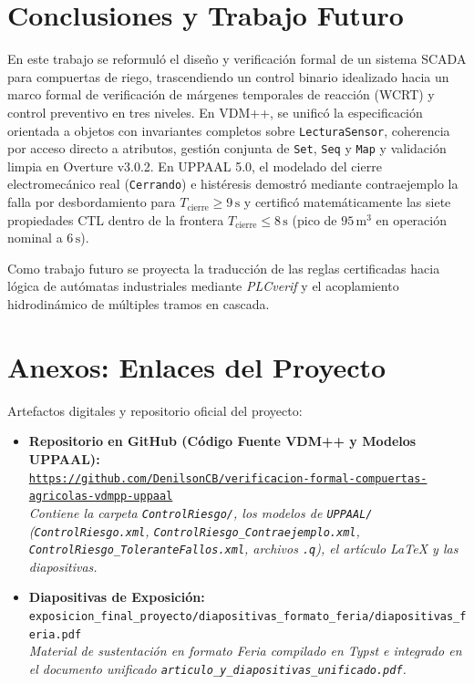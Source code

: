 \documentclass[conference]{IEEEtran}
\begin{document}
\section{Conclusiones y Trabajo Futuro}
En este trabajo se reformuló el diseño y verificación formal de un sistema SCADA para compuertas de riego, trascendiendo un control binario idealizado hacia un marco formal de verificación de márgenes temporales de reacción (WCRT) y control preventivo en tres niveles. En VDM++, se unificó la especificación orientada a objetos con invariantes completos sobre \texttt{LecturaSensor}, coherencia por acceso directo a atributos, gestión conjunta de \texttt{Set}, \texttt{Seq} y \texttt{Map} y validación limpia en Overture v3.0.2. En UPPAAL 5.0, el modelado del cierre electromecánico real (\texttt{Cerrando}) e histéresis demostró mediante contraejemplo la falla por desbordamiento para $T_{\text{cierre}} \geq 9\,\text{s}$ y certificó matemáticamente las siete propiedades CTL dentro de la frontera $T_{\text{cierre}} \leq 8\,\text{s}$ (pico de $95\,\text{m}^3$ en operación nominal a $6\,\text{s}$).

Como trabajo futuro se proyecta la traducción de las reglas certificadas hacia lógica de autómatas industriales mediante \textit{PLCverif} \cite{lopezmiguel2021plcverif} y el acoplamiento hidrodinámico de múltiples tramos en cascada.

\section*{Anexos: Enlaces del Proyecto}
Artefactos digitales y repositorio oficial del proyecto:
\begin{itemize}
    \item \textbf{Repositorio en GitHub (Código Fuente VDM++ y Modelos UPPAAL):} \\
    \href{https://github.com/DenilsonCB/verificacion-formal-compuertas-agricolas-vdmpp-uppaal}{\texttt{https://github.com/DenilsonCB/\allowbreak verificacion-formal-\allowbreak compuertas-agricolas-\allowbreak vdmpp-uppaal}} \\
    \textit{Contiene la carpeta \texttt{ControlRiesgo/}, los modelos de \texttt{UPPAAL/} (\texttt{ControlRiesgo.xml}, \texttt{ControlRiesgo\_Contraejemplo.xml}, \texttt{ControlRiesgo\_ToleranteFallos.xml}, archivos \texttt{.q}), el artículo LaTeX y las diapositivas.}
    \item \textbf{Diapositivas de Exposición:} \\
    \texttt{exposicion\_\allowbreak final\_\allowbreak proyecto/\allowbreak diapositivas\_\allowbreak formato\_\allowbreak feria/\allowbreak diapositivas\_\allowbreak feria.pdf} \\
    \textit{Material de sustentación en formato Feria compilado en Typst e integrado en el documento unificado \texttt{articulo\_\allowbreak y\_\allowbreak diapositivas\_\allowbreak unificado.pdf}.}
\end{itemize}



\end{document}
